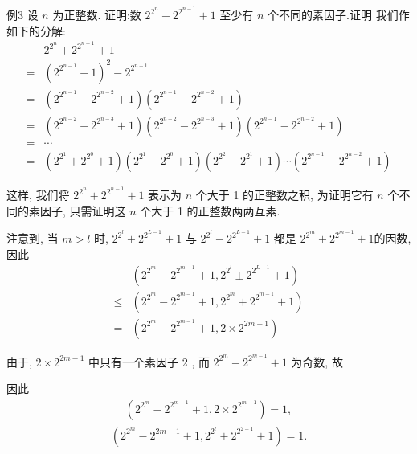 例3 设 $n$ 为正整数. 证明:数 $2^{2^{n}}+2^{2^{n-1}}+1$ 至少有 $n$ 个不同的素因子.证明 我们作如下的分解:
\begin{align}
	  & 2^{2^{n}}+2^{2^{n-1}}+1                                                                                                                             \\
	= & \left(2^{2^{n-1}}+1\right)^{2}-2^{2^{n-1}}                                                                                                          \\
	= & \left(2^{2^{n-1}}+2^{2^{n-2}}+1\right)\left(2^{2^{n-1}}-2^{2^{n-2}}+1\right)                                                                        \\
	= & \left(2^{2^{n-2}}+2^{2^{n-3}}+1\right)\left(2^{2^{n-2}}-2^{2^{n-3}}+1\right)\left(2^{2^{n-1}}-2^{2^{n-2}}+1\right)                                  \\
	= & \cdots                                                                                                                                              \\
	= & \left(2^{2^{1}}+2^{2^{0}}+1\right)\left(2^{2^{1}}-2^{2^{0}}+1\right)\left(2^{2^{2}}-2^{2^{1}}+1\right) \cdots\left(2^{2^{n-1}}-2^{2^{n-2}}+1\right)
\end{align}

这样, 我们将 $2^{2^{n}}+2^{2^{n-1}}+1$ 表示为 $n$ 个大于 1 的正整数之积, 为证明它有 $n$ 个不同的素因子, 只需证明这 $n$ 个大于 1 的正整数两两互素.

注意到, 当 $m>l$ 时, $2^{2^{l}}+2^{2^{L-1}}+1$ 与 $2^{2^{l}}-2^{2^{L-1}}+1$ 都是 $2^{2^{m}}+2^{2^{m-1}}+1$的因数, 因此
\begin{align}
	          & \left(2^{2^{m}}-2^{2^{m-1}}+1,2^{2^{l}} \pm 2^{2^{L-1}}+1\right) \\
	\leqslant & \left(2^{2^{m}}-2^{2^{m-1}}+1,2^{2^{m}}+2^{2^{m-1}}+1\right)     \\
	=         & \left(2^{2^{m}}-2^{2^{m-1}}+1,2 \times 2^{2 m-1}\right)
\end{align}

由于, $2 \times 2^{2 m-1}$ 中只有一个素因子 2 , 而 $2^{2^{m}}-2^{2^{m-1}}+1$ 为奇数, 故

因此
\begin{align*}
	\left(2^{2^{m}}-2^{2^{m-1}}+1,2 \times 2^{2^{m-1}}\right)=1,
\end{align*}
\begin{align*}
	\left(2^{2^{m}}-2^{2 m-1}+1,2^{2^{l}} \pm 2^{2^{2-1}}+1\right)=1 .
\end{align*}

